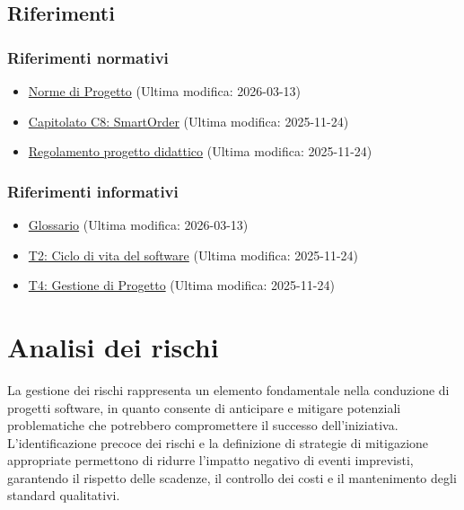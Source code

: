 \documentclass[a4paper, 11pt, oneside]{scrartcl} %
\begin{document}
\subsection{Riferimenti}
\subsubsection{Riferimenti normativi}
\begin{itemize}
    \item \href{https://github.com/swenightpro/Documentazione/blob/main/docs/RTB/Documentazione%20Interna/}{Norme di Progetto} (Ultima modifica: 2026-03-13)
    \item \href{https://www.math.unipd.it/~tullio/IS-1/2025/Progetto/C8.pdf}{Capitolato C8: SmartOrder} (Ultima modifica: 2025-11-24)
    \item \href{https://www.math.unipd.it/~tullio/IS-1/2025/Dispense/PD1.pdf}{Regolamento progetto didattico} (Ultima modifica: 2025-11-24)
\end{itemize}

\subsubsection{Riferimenti informativi}
\begin{itemize}
    \item \href{https://github.com/swenightpro/Documentazione/blob/main/docs/RTB/Documentazione%20Esterna}{Glossario} (Ultima modifica: 2026-03-13)
    \item \href{https://www.math.unipd.it/~tullio/IS-1/2025/Dispense/T02.pdf}{T2: Ciclo di vita del software} (Ultima modifica: 2025-11-24)
    \item \href{https://www.math.unipd.it/~tullio/IS-1/2025/Dispense/T04.pdf}{T4: Gestione di Progetto} (Ultima modifica: 2025-11-24)
\end{itemize}

\newpage
\section{Analisi dei rischi}
\label{sec:analisi_rischi}
La gestione dei rischi rappresenta un elemento fondamentale nella conduzione di progetti software, in quanto consente di anticipare e mitigare potenziali problematiche che potrebbero compromettere il successo dell'iniziativa. L'identificazione precoce dei rischi e la definizione di strategie di mitigazione appropriate permettono di ridurre l'impatto negativo di eventi imprevisti, garantendo il rispetto delle scadenze, il controllo dei costi e il mantenimento degli standard qualitativi.
\end{document}
